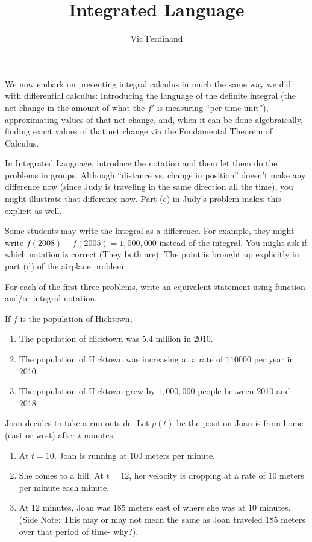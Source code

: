 \documentclass{ximera}
\author{Vic Ferdinand}
\title{Integrated Language}
\begin{document}
\begin{abstract}
\end{abstract}
\maketitle


\begin{instructorIntro}
We now embark on presenting integral calculus in much the same way we did with differential calculus:  Introducing the language of the definite integral (the net change in the amount of what the $f'$ is measuring ``per time unit''), approximating values of that net change, and, when it can be done algebraically, finding exact values of that net change via the Fundamental Theorem of Calculus.

In Integrated Language, introduce the notation and them let them do the problems in groups.  Although ``distance vs. change in position'' doesn't make any difference now (since Judy is traveling in the same direction all the time), you might illustrate that difference now.  Part (c) in Judy's problem makes this explicit as well.

Some students may write the integral as a difference.  For example, they might write $f(2008)-f(2005)=1,000,000$ instead of the integral.  You might ask if which notation is correct (They both are).  The point is brought up explicitly in part (d) of the airplane problem



\end{instructorIntro}

For each of the first three problems, write an equivalent statement using function and/or integral notation.


\begin{question} 
If $f$ is the population of Hicktown, 
\begin{enumerate}
\item The population of Hicktown was $5.4$ million in 2010.
\item The population of Hicktown was increasing at a rate of $110000$ per year in 2010.
\item	The population of Hicktown grew by $1,000,000$ people between 2010 and 2018.
\end{enumerate}
\end{question}


\begin{question} 
Joan decides to take a run outside.  Let $p(t)$ be the position Joan is from home (east or west) after $t$ minutes.
\begin{enumerate} 
\item 	At $t = 10$, Joan is running at $100$ meters per minute.
\item 	She comes to a hill.  At $t=12$, her velocity is dropping at a rate of $10$ meters per minute each minute.
\item 	At $12$ minutes, Joan was $185$ meters east of where she was at $10$ minutes. (Side Note:  This may or may not mean the same as Joan traveled $185$ meters over that period of time- why?).
\end{enumerate}
\end{question} 
\end{document}
